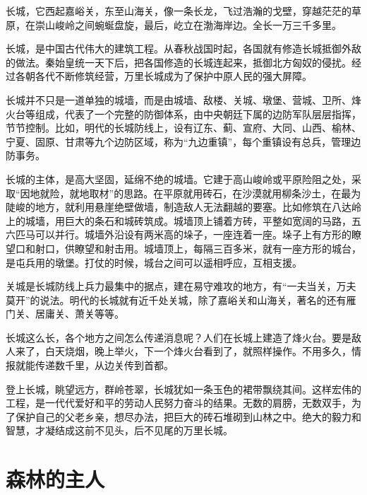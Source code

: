 \documentclass[12pt,UTF-8,openany]{ctexbook}
\begin{document}
\begin{large}
    
    长城，它西起嘉峪关，东至山海关，像一条长龙，飞过浩瀚的戈壁，穿越茫茫的草原，在崇山峻岭之间蜿蜒盘旋，最后，屹立在渤海岸边。全长一万三千多里。
    
    长城，是中国古代伟大的建筑工程。从春秋战国时起，各国就有修造长城抵御外敌的做法。秦始皇统一天下后，把各国修造的长城连起来，抵御北方匈奴的侵扰。经过各朝各代不断修筑经营，万里长城成为了保护中原人民的强大屏障。
    
    长城并不只是一道单独的城墙，而是由城墙、敌楼、关城、墩堡、营城、卫所、烽火台等组成，代表了一个完整的防御体系，由中央朝廷下属的边防军队层层指挥，节节控制。比如，明代的长城防线上，设有辽东、蓟、宣府、大同、山西、榆林、宁夏、固原、甘肃等九个边防区域，称为“九边重镇”，每个重镇设有总兵，管理边防事务。
    
    长城的主体，是高大坚固，延绵不绝的城墙。它建于高山峻岭或平原险阻之处，采取“因地就险，就地取材”的思路。在平原就用砖石，在沙漠就用柳条沙土，在最为陡峻的地方，就利用悬崖绝壁做墙，制造敌人无法翻越的要塞。比如修筑在八达岭上的城墙，用巨大的条石和城砖筑成。城墙顶上铺着方砖，平整如宽阔的马路，五六匹马可以并行。城墙外沿设有两米高的垛子，一座连着一座。垛子上有方形的瞭望口和射口，供瞭望和射击用。城墙顶上，每隔三百多米，就有一座方形的城台，是屯兵用的墩堡。打仗的时候，城台之间可以遥相呼应，互相支援。
    
    关城是长城防线上兵力最集中的据点，建在易守难攻的地方，有“一夫当关，万夫莫开”的说法。明代的长城就有近千处关城，除了嘉峪关和山海关，著名的还有雁门关、居庸关、萧关等等。
    
    长城这么长，各个地方之间怎么传递消息呢？人们在长城上建造了烽火台。要是敌人来了，白天烧烟，晚上举火，下一个烽火台看到了，就照样操作。不用多久，情报就能传递数千里，从边关传到首都。
    
    登上长城，眺望远方，群岭苍翠，长城犹如一条玉色的裙带飘绕其间。这样宏伟的工程，是一代代爱好和平的劳动人民努力奋斗的结果。无数的肩膀，无数双手，为了保护自己的父老乡亲，想尽办法，把巨大的砖石堆砌到山林之中。绝大的毅力和智慧，才凝结成这前不见头，后不见尾的万里长城。
    
\end{large}



\chapter{森林的主人}
\end{document}
